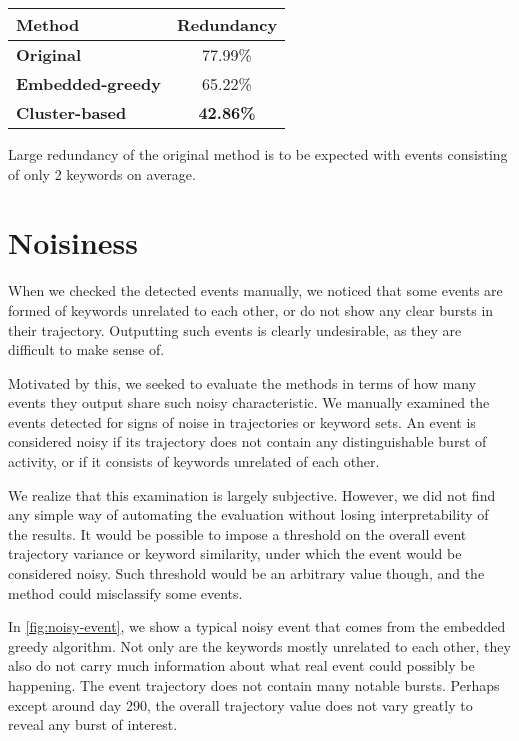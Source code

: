 \hspace{\fill}

\begin{minipage}{\linewidth}
\centering
\begin{tabular}{ l c }\toprule[1.5pt]
\bf Method 	 & \bf Redundancy \\ \midrule
\bf Original &  77.99\% \\
\bf Embedded-greedy   &  65.22\% \\
\bf Cluster-based &  \bf 42.86\% \\ \bottomrule[1.25pt]
\end {tabular}\par
{} \label{tab:title} 
\end{minipage}

\hspace{\fill}

Large redundancy of the original method is to be expected with events consisting of only 2 keywords on average.

\section{Noisiness} \label{sec:noise-evaluation}

When we checked the detected events manually, we noticed that some events are formed of keywords unrelated to each other, or do not show any clear bursts in their trajectory. Outputting such events is clearly undesirable, as they are difficult to make sense of.

Motivated by this, we seeked to evaluate the methods in terms of how many events they output share such noisy characteristic. We manually examined the events detected for signs of noise in trajectories or keyword sets. An event is considered noisy if its trajectory does not contain any distinguishable burst of activity, or if it consists of keywords unrelated of each other.

We realize that this examination is largely subjective. However, we did not find any simple way of automating the evaluation without losing interpretability of the results. It would be possible to impose a threshold on the overall event trajectory variance or keyword similarity, under which the event would be considered noisy. Such threshold would be an arbitrary value though, and the method could misclassify some events.

In \autoref{fig:noisy-event}, we show a typical noisy event that comes from the embedded greedy algorithm. Not only are the keywords mostly unrelated to each other, they also do not carry much information about what real event could possibly be happening. The event trajectory does not contain many notable bursts. Perhaps except around day 290, the overall trajectory value does not vary greatly to reveal any burst of interest.

